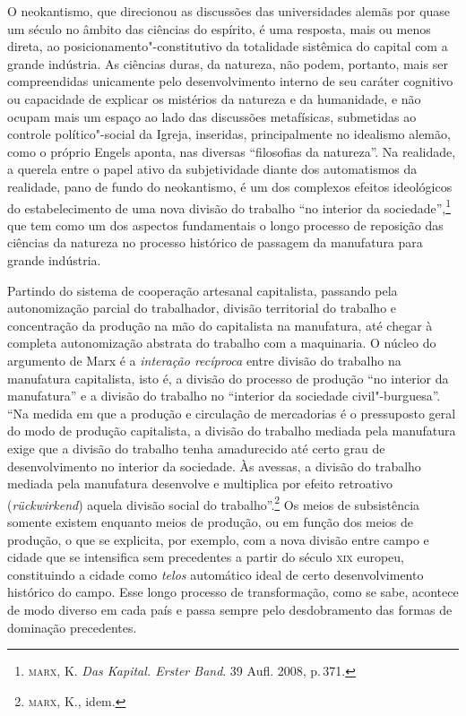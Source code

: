 O neokantismo, que direcionou as discussões das universidades alemãs por
quase um século no âmbito das ciências do espírito, é uma resposta, mais
ou menos direta, ao posicionamento"-constitutivo da totalidade
sistêmica do capital com a grande indústria. As ciências duras, da
natureza, não podem, portanto, mais ser compreendidas unicamente pelo
desenvolvimento interno de seu caráter cognitivo ou capacidade de
explicar os mistérios da natureza e da humanidade, e não ocupam mais um
espaço ao lado das discussões metafísicas, submetidas ao controle
político"-social da Igreja, inseridas, principalmente no idealismo
alemão, como o próprio Engels aponta, nas diversas ``filosofias da
natureza''. Na realidade, a querela entre o papel ativo da subjetividade
diante dos automatismos da realidade, pano de fundo do neokantismo, é um
dos complexos efeitos ideológicos do estabelecimento de uma nova divisão
do trabalho ``no interior da sociedade'',\footnote{\textsc{marx}, K. \textit{Das Kapital. Erster Band}. 39 Aufl. 2008, p.\,371.} que tem como um dos aspectos fundamentais o longo processo de reposição das ciências da natureza no processo histórico de passagem da
manufatura para grande indústria.

Partindo do sistema de cooperação artesanal capitalista, passando pela %
autonomização parcial do trabalhador, divisão territorial do trabalho e
concentração da produção na mão do capitalista na manufatura, até chegar
à completa autonomização abstrata do trabalho com a maquinaria. O núcleo
do argumento de Marx é a \emph{interação recíproca} entre divisão do
trabalho na manufatura capitalista, isto é, a divisão do processo de
produção ``no interior da manufatura'' e a divisão do trabalho no
``interior da sociedade civil"-burguesa''. ``Na medida em que a produção
e circulação de mercadorias é o pressuposto geral do modo de produção
capitalista, a divisão do trabalho mediada pela manufatura exige que a
divisão do trabalho tenha amadurecido até certo grau de desenvolvimento
no interior da sociedade. Às avessas, a divisão do trabalho mediada pela
manufatura desenvolve e multiplica por efeito retroativo
(\emph{rückwirkend}) aquela divisão social do trabalho''.\footnote{\textsc{marx}, K., idem.} Os
meios de subsistência somente existem enquanto meios de produção, ou em
função dos meios de produção, o que se explicita, por exemplo, com a
nova divisão entre campo e cidade que se intensifica sem precedentes a
partir do século \textsc{xix} europeu, constituindo a cidade como
\emph{telos} automático ideal de certo desenvolvimento histórico do
campo. Esse longo processo de transformação, como se sabe, acontece de
modo diverso em cada país e passa sempre pelo desdobramento das formas
de dominação precedentes.

